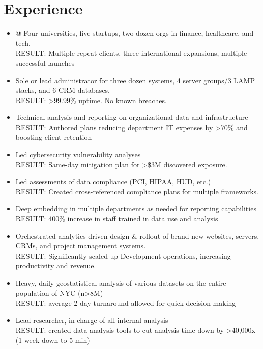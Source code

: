 \documentclass[]{deedy-resume-openfont}
\begin{document}
\section{Experience}
    \begin{itemize}
        \item @ Four universities, five startups, two dozen orgs in finance, healthcare, and tech.
        \\RESULT: Multiple repeat clients, three international expansions, multiple successful launches
    	\item Sole or lead administrator for three dozen systems, 4 server groups/3 LAMP stacks, and 6 CRM databases.
        \\ RESULT: >99.99\% uptime. No known breaches.
        \item Technical analysis and reporting on organizational data and infrastructure
        \\ RESULT: Authored plans reducing department IT expenses by >70\% and boosting client retention
        \item Led cybersecurity vulnerability analyses
        \\ RESULT: Same-day mitigation plan for >\$3M discovered exposure.
        \item Led assessments of data compliance (PCI, HIPAA, HUD, etc.)
        \\ RESULT: Created cross-referenced compliance plans for multiple frameworks.
        \item Deep embedding in multiple departments as needed for reporting capabilities
        \\ RESULT: 400\% increase in staff trained in data use and analysis
        \item Orchestrated analytics-driven design \& rollout of brand-new websites, servers, CRMs, and project management systems.
        \\ RESULT: Significantly scaled up Development operations, increasing productivity and revenue.
        \item Heavy, daily geostatistical analysis of various datasets on the entire population of NYC (n>8M)
        \\ RESULT: average 2-day turnaround allowed for quick decision-making
        \item Lead researcher, in charge of all internal analysis
        \\ RESULT: created data analysis tools to cut analysis time down by >40,000x (1 week down to 5 min)
    \end{itemize}
\end{document}
